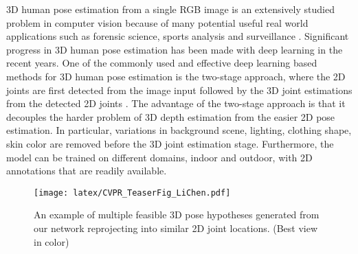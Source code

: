 \documentclass[10pt,twocolumn,letterpaper]{article}
\begin{document}
3D human pose estimation from a single RGB  image is an extensively studied problem in computer vision because of many potential useful real world applications such as forensic science, sports analysis and surveillance \etc. Significant progress in 3D human pose estimation has been made with deep learning  in the recent years.  One of the commonly used and effective deep learning based methods for 3D human pose estimation is the two-stage approach, where the 2D joints are first detected from the image input \cite{newell2016stacked, wei2016convolutional} followed by the 3D joint estimations from the detected 2D joints \cite{akhter2015pose,zhou2016sparseness, bogo2016keep,martinez2017simple,hossain2018exploiting, chen2016synthesizing,yasin2016dual, moreno20173d}. The advantage of the two-stage approach is that it decouples the harder problem of 3D depth estimation from the easier 2D pose estimation. In particular, variations in background scene, lighting, clothing shape, skin color \etc are removed before the 3D joint estimation stage. Furthermore, the model can be trained on different domains, \eg indoor and outdoor, with 2D annotations that are readily available.

\begin{figure}[t]
\begin{center}
\texttt{[image: latex/CVPR\_TeaserFig\_LiChen.pdf]}
\end{center}
\vspace{-3mm}
   \caption{An example of multiple feasible 3D pose hypotheses generated from our network reprojecting into similar 2D joint locations. (Best view in color)}

\label{fig:onecol}
\vspace{-4mm}
\end{figure}
\end{document}
